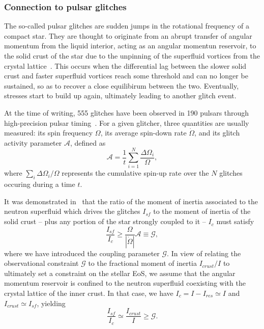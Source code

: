 \subsubsection{Connection to pulsar glitches}\label{subsubsec:glitch}

The so-called pulsar glitches are sudden jumps in the rotational frequency of 
a compact star. They are thought to originate from an abrupt transfer of 
angular momentum from the liquid interior, acting as an angular momentun
reservoir, to the solid crust of the star due to the unpinning of the 
superfluid vortices from the crystal lattice~\cite{Anderson1975}. This occurs 
when the differential lag between the slower solid crust and faster superfluid 
vortices reach some threshold and can no longer be sustained, so as to recover 
a close equilibirum between the two. Eventually, stresses start to build up 
again, ultimately leading to another glitch event.

At the time of writing, 555 glitches have been observed in 190 pulsars through 
high-precision pulsar timing~\cite{Espinoza2011,Glitches}. For a given 
glitcher, three quantities are usually measured: its spin frequency $\Omega$, 
its average spin-down rate $\dot{\Omega}$, and its glitch activity parameter
$\mathcal{A}$, defined as
%
\begin{equation}
  \mathcal{A} = \frac{1}{t}\sum_{i=1}^{N} \frac{\Delta \Omega_i}{\Omega},
\end{equation}
%
where $\sum_i \Delta\Omega_i/\Omega$ represents the cumulative spin-up rate
over the $N$ glitches occuring during a time $t$.

It was demonstrated in~\cite{Link1999} that the ratio of the moment of inertia
associated to the neutron superfluid which drives the glitches $I_{sf}$ to the 
moment of inertia of the solid crust -- plus any portion of the star strongly 
coupled to it -- $I_c$ must satisfy 
%
\begin{equation}
  \frac{I_{sf}}{I_c} \geq \frac{\Omega}{|\dot{\Omega}|}\mathcal{A} 
  \equiv \mathcal{G},
\end{equation}
%
where we have introduced the coupling parameter $\mathcal{G}$. In view of
relating the observational constraint $\mathcal{G}$ to the fractional moment of
inertia $I_{crust}/I$ to ultimately set a constraint on the stellar EoS, we 
assume that the angular momentum reservoir is confined to the neutron 
superfluid coexisting with the crystal lattice of the inner crust. In that 
case, we have $I_c = I - I_{res} \simeq I$ and $I_{crust} \simeq I_{sf}$,
yielding~\cite{Link1999}
%
\begin{equation}
  \frac{I_{sf}}{I_c} \simeq \frac{I_{crust}}{I} 
  \geq \mathcal{G}\label{eq:noent}.
\end{equation}
%

